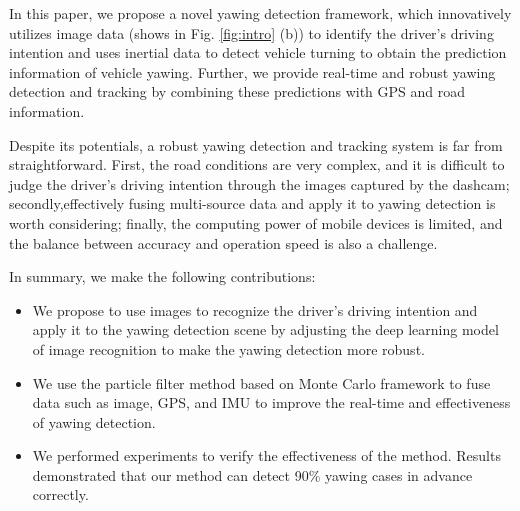 \documentclass[journal]{IEEEtran}
\begin{document}
In this paper, we propose a novel yawing detection framework, which innovatively utilizes image data (shows in Fig. \ref{fig:intro} (b)) to identify the driver's driving intention and uses inertial data to detect vehicle turning to obtain the prediction information of vehicle yawing. Further, we provide real-time and robust yawing detection and tracking by combining these predictions with GPS and road information.\IEEEpubidadjcol

Despite its potentials, a robust yawing detection and tracking system is far from straightforward. First, the road conditions are very complex, and it is difficult to judge the driver's driving intention through the images captured by the dashcam; secondly,effectively fusing multi-source data and apply it to yawing detection is worth considering; finally, the computing power of mobile devices is limited, and the balance between accuracy and operation speed is also a challenge.

In summary, we make the following contributions:
\begin{itemize}
    \item We propose to use images to recognize the driver's driving intention and apply it to the yawing detection scene by adjusting the deep learning model of image recognition to make the yawing detection more robust.
    \item We use the particle filter method based on Monte Carlo framework to fuse data such as image, GPS, and IMU to improve the real-time and effectiveness of yawing detection.
    \item We performed experiments to verify the effectiveness of the method. Results demonstrated that our method can detect 90\% yawing cases in advance correctly.
\end{itemize}
\end{document}
